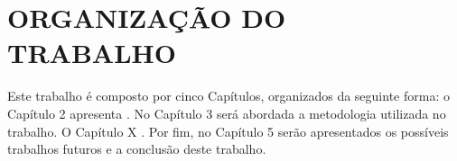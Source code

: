 \section{ORGANIZAÇÃO DO TRABALHO}

Este trabalho é composto por cinco Capítulos, organizados da seguinte forma: o Capítulo 2 apresenta . No Capítulo 3 será abordada a metodologia utilizada no trabalho. O Capítulo X . Por ﬁm, no Capítulo 5 serão apresentados os possíveis trabalhos futuros e a conclusão deste trabalho.
